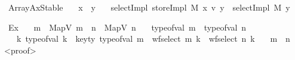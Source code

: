 \documentclass[11pt]{article}
\begin{document}
\begin{isabellebody}
\isamarkupfalse%
\ ArrayAxStable{\isacharcolon}{\kern0pt}\isanewline
\ \ \ {\isachardoublequoteopen}x\ {\isasymnoteq}\ y{\isachardoublequoteclose}\isanewline
\ \ \ {\isachardoublequoteopen}selectImpl\ {\isacharparenleft}{\kern0pt}storeImpl\ M\ x\ v{\isacharparenright}{\kern0pt}\ y\ {\isacharequal}{\kern0pt}\ selectImpl\ M\ y{\isachardoublequoteclose}\isanewline

\isamarkupfalse%
\ Ex{\isacharcolon}{\kern0pt}\isanewline
\ \ \ {\isachardoublequoteopen}m\ {\isacharequal}{\kern0pt}\ MapV\ m{\isacharprime}{\kern0pt}\ {\isasymand}\ n\ {\isacharequal}{\kern0pt}\ MapV\ n{\isacharprime}{\kern0pt}{\isachardoublequoteclose}\isanewline
\ \ \ {\isachardoublequoteopen}type{\isacharunderscore}{\kern0pt}of{\isacharunderscore}{\kern0pt}val\ m\ {\isacharequal}{\kern0pt}\ type{\isacharunderscore}{\kern0pt}of{\isacharunderscore}{\kern0pt}val\ n{\isachardoublequoteclose}\isanewline
\ \ \ {\isachardoublequoteopen}{\isasymforall}k{\isachardot}{\kern0pt}\ type{\isacharunderscore}{\kern0pt}of{\isacharunderscore}{\kern0pt}val\ k\ {\isacharequal}{\kern0pt}\ key{\isacharunderscore}{\kern0pt}ty\ {\isacharparenleft}{\kern0pt}type{\isacharunderscore}{\kern0pt}of{\isacharunderscore}{\kern0pt}val\ m{\isacharparenright}{\kern0pt}\ {\isasymlongrightarrow}\ wf{\isacharunderscore}{\kern0pt}select\ m\ k\ {\isacharequal}{\kern0pt}\ wf{\isacharunderscore}{\kern0pt}select\ n\ k{\isachardoublequoteclose}\isanewline
\ \ \ {\isachardoublequoteopen}m\ {\isacharequal}{\kern0pt}\ n{\isachardoublequoteclose}\isanewline
<proof>\isanewline
\end{isabellebody}
\end{document}
